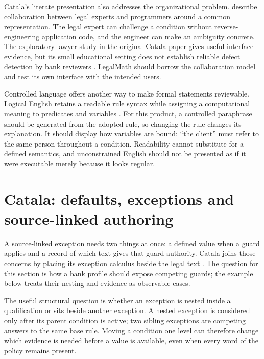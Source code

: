 \documentclass[12pt,a4paper,oneside,openany]{book}
\begin{document}
Catala's literate presentation also addresses the organizational problem.
\citet[sec.~4.2]{huttner2022} describe collaboration between legal experts and
programmers around a common representation. The legal expert can challenge a
condition without reverse-engineering application code, and the engineer can
make an ambiguity concrete. The exploratory lawyer study in the original Catala
paper gives useful interface evidence, but its small educational setting does
not establish reliable defect detection by bank reviewers
\citep[sec.~6]{catala2021}. LegalMath should borrow the collaboration model and
test its own interface with the intended users.

Controlled language offers another way to make formal statements reviewable.
Logical English retains a readable rule syntax while assigning a computational
meaning to predicates and variables \citep{logicalenglish2023}. For this product,
a controlled paraphrase should be generated from the adopted rule, so changing
the rule changes its explanation. It should display how variables are bound:
``the client'' must refer to the same person throughout a condition. Readability
cannot substitute for a defined semantics, and unconstrained English should not
be presented as if it were executable merely because it looks regular.

\section{Catala: defaults, exceptions and source-linked authoring}
\label{merge:M04:03}

\label{sec:languages-catala}
A source-linked exception needs two things at once: a defined value when a
guard applies and a record of which text gives that guard authority. Catala
joins those concerns by placing its exception calculus beside the legal text
\citep[secs.~2--4]{catala2021}. The question for this section is how a bank
profile should expose competing guards; the example below treats their nesting
and evidence as observable cases.

The useful structural question is whether an exception is nested inside a
qualification or sits beside another exception. A nested exception is considered
only after its parent condition is active; two sibling exceptions are competing
answers to the same base rule. Moving a condition one level can therefore change
which evidence is needed before a value is available, even when every word of the
policy remains present.
\end{document}
